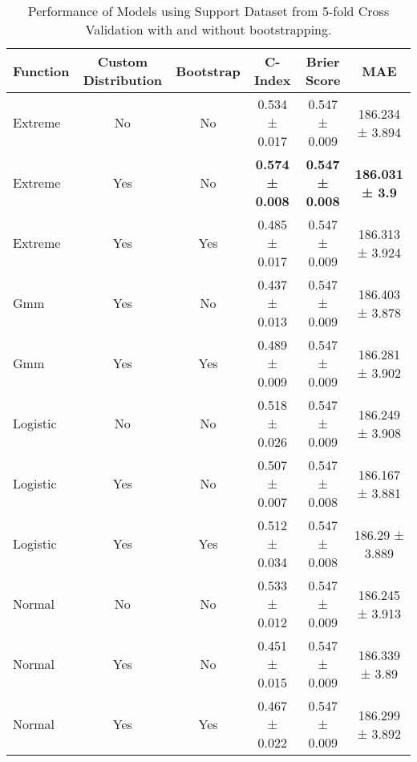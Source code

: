 \begin{table}[h!]
\centering
\caption{Performance of Models using Support Dataset from 5-fold Cross Validation with and without bootstrapping.}
\label{tab:model_performance_support_2}
\begin{tabular}{l|c|c|c|c|c}
\hline
\textbf{Function} & \textbf{Custom Distribution} & \textbf{Bootstrap} & \textbf{C-Index} & \textbf{Brier Score} & \textbf{MAE} \\
\hline
Extreme & No & No & 0.534 ± 0.017 & 0.547 ± 0.009 & 186.234 ± 3.894 \\
Extreme & Yes & No & \textbf{0.574 ± 0.008} & \textbf{0.547 ± 0.008} & \textbf{186.031 ± 3.9} \\
Extreme & Yes & Yes & 0.485 ± 0.017 & 0.547 ± 0.009 & 186.313 ± 3.924 \\
Gmm & Yes & No & 0.437 ± 0.013 & 0.547 ± 0.009 & 186.403 ± 3.878 \\
Gmm & Yes & Yes & 0.489 ± 0.009 & 0.547 ± 0.009 & 186.281 ± 3.902 \\
Logistic & No & No & 0.518 ± 0.026 & 0.547 ± 0.009 & 186.249 ± 3.908 \\
Logistic & Yes & No & 0.507 ± 0.007 & 0.547 ± 0.008 & 186.167 ± 3.881 \\
Logistic & Yes & Yes & 0.512 ± 0.034 & 0.547 ± 0.008 & 186.29 ± 3.889 \\
Normal & No & No & 0.533 ± 0.012 & 0.547 ± 0.009 & 186.245 ± 3.913 \\
Normal & Yes & No & 0.451 ± 0.015 & 0.547 ± 0.009 & 186.339 ± 3.89 \\
Normal & Yes & Yes & 0.467 ± 0.022 & 0.547 ± 0.009 & 186.299 ± 3.892 \\
\hline
\end{tabular}
\end{table}

